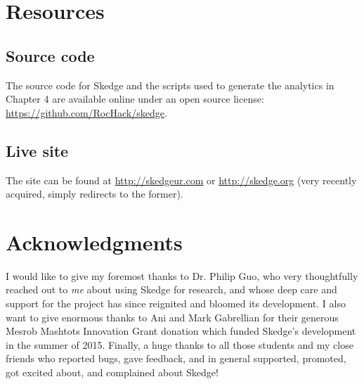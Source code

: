 \section{Resources}

\subsection*{Source code}

The source code for Skedge and the scripts used to generate the analytics in Chapter 4 are available online under an open source license:\\
\url{https://github.com/RocHack/skedge}.

\subsection*{Live site}

\noindent The site can be found at \url{http://skedgeur.com} or \url{http://skedge.org} (very recently acquired, simply redirects to the former).


\section{Acknowledgments}

I would like to give my foremost thanks to Dr. Philip Guo, who very thoughtfully reached out to \emph{me} about using Skedge for research, and whose deep care and support for the project has since reignited and bloomed its development. I also want to give enormous thanks to Ani and Mark Gabrellian for their generous Mesrob Mashtots Innovation Grant donation which funded Skedge's development in the summer of 2015. Finally, a huge thanks to all those students and my close friends who reported bugs, gave feedback, and in general supported, promoted, got excited about, and complained about Skedge!